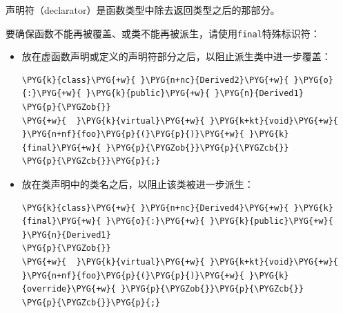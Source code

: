 
\begin{myNote}
声明符（declarator）是函数类型中除去返回类型之后的那部分。
\end{myNote}



要确保函数不能再被覆盖、或类不能再被派生，请使用\texttt{final}特殊标识符：



\begin{itemize}
\item 放在虚函数声明或定义的声明符部分之后，以阻止派生类中进一步覆盖：



\begin{codeblockbg}
\begin{Verbatim}[commandchars=\\\{\},breaklines=true,breakanywhere=true,fontsize=\codefont,xleftmargin=17bp]
\PYG{k}{class}\PYG{+w}{ }\PYG{n+nc}{Derived2}\PYG{+w}{ }\PYG{o}{:}\PYG{+w}{ }\PYG{k}{public}\PYG{+w}{ }\PYG{n}{Derived1}
\PYG{p}{\PYGZob{}}
\PYG{+w}{  }\PYG{k}{virtual}\PYG{+w}{ }\PYG{k+kt}{void}\PYG{+w}{ }\PYG{n+nf}{foo}\PYG{p}{(}\PYG{p}{)}\PYG{+w}{ }\PYG{k}{final}\PYG{+w}{ }\PYG{p}{\PYGZob{}}\PYG{p}{\PYGZcb{}}
\PYG{p}{\PYGZcb{}}\PYG{p}{;}
\end{Verbatim}
\end{codeblockbg}



\item 放在类声明中的类名之后，以阻止该类被进一步派生：



\begin{codeblockbg}
\begin{Verbatim}[commandchars=\\\{\},breaklines=true,breakanywhere=true,fontsize=\codefont,xleftmargin=17bp]
\PYG{k}{class}\PYG{+w}{ }\PYG{n+nc}{Derived4}\PYG{+w}{ }\PYG{k}{final}\PYG{+w}{ }\PYG{o}{:}\PYG{+w}{ }\PYG{k}{public}\PYG{+w}{ }\PYG{n}{Derived1}
\PYG{p}{\PYGZob{}}
\PYG{+w}{  }\PYG{k}{virtual}\PYG{+w}{ }\PYG{k+kt}{void}\PYG{+w}{ }\PYG{n+nf}{foo}\PYG{p}{(}\PYG{p}{)}\PYG{+w}{ }\PYG{k}{override}\PYG{+w}{ }\PYG{p}{\PYGZob{}}\PYG{p}{\PYGZcb{}}
\PYG{p}{\PYGZcb{}}\PYG{p}{;}
\end{Verbatim}
\end{codeblockbg}

\end{itemize}


